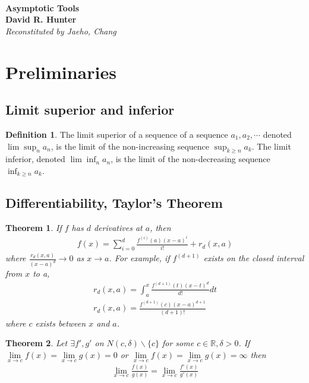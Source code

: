 \documentclass[12pt]{article}
\renewcommand{\=}[1]{\stackrel{#1}{=}} %
\newtheorem{thm}{Theorem}[section]
\theoremstyle{definition}
\newtheorem*{dfn}{Definition}
\begin{document}
	{\noindent\Huge\bf  \\[0.5\baselineskip] {\selectfont  
			Asymptotic Tools
	}}
	\\[2\baselineskip] %
	{{\bf {}\selectfont David R. Hunter}\\ {\textit{\selectfont Reconstituted by Jaeho, Chang}}}
	
	\section{Preliminaries}
	\subsection{Limit superior and inferior}
		\begin{dfn}
			The limit superior of a sequence of a sequence $a_1,a_2,\cdots$ denoted $\lim\sup_na_n$, is the limit of the non-increasing sequence $\sup_{k\geq n}a_k$. The limit inferior, denoted $\lim\inf_na_n$, is the limit of the non-decreasing sequence $\inf_{k\geq n}a_k$.
		\end{dfn}
	\subsection{Differentiability, Taylor's Theorem}
		\begin{thm}
			If $f$ has $d$ derivatives at $a$, then
			\begin{align}
			f(x)=\sum_{i=0}^{d}\frac{f^{(i)}(a)(x-a)^i}{i!}+r_d(x,a)
			\end{align}
			where $\frac{r_d(x,a)}{(x-a)^d}\rightarrow0$ as $x\rightarrow a$. For example, if $f^{(d+1)}$ exists on the closed interval from $x$ to a,
			\begin{align}
			r_d(x,a)=\int_{a}^{x}\frac{f^{(d+1)}(t)(x-t)^d}{d!}dt\\
			r_d(x,a)=\frac{f^{(d+1)}(c)(x-a)^{d+1}}{(d+1)!}
			\end{align}
			where $c$ exists between $x$ and $a$.
		\end{thm}
	\begin{thm}
		Let $\exists f',g'$ on $N(c,\delta)\backslash\{c\}$ for some $c\in\mathbb{R},\delta>0$. If $\lim\limits_{x\rightarrow c}f(x)=\lim\limits_{x\rightarrow c}g(x)=0$ or $\lim\limits_{x\rightarrow c}f(x)=\lim\limits_{x\rightarrow c}g(x)=\infty$ then
		\begin{align}
		\lim\limits_{x\rightarrow c}\frac{f(x)}{g(x)}=\lim\limits_{x\rightarrow c}\frac{f'(x)}{g'(x)}
		\end{align}
	\end{thm}
\end{document}
